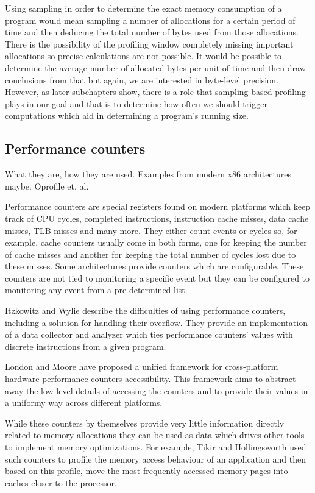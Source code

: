 Using sampling in order to determine the exact memory consumption of a program would mean sampling a number of allocations for a certain period of time and then deducing the total number of bytes used from those allocations. There is the possibility of the profiling window completely missing important allocations so precise calculations are not possible. It would be possible to determine the average number of allocated bytes per unit of time and then draw conclusions from that but again, we are interested in byte-level precision. However, as later subchapters show, there is a role that sampling based profiling plays in our goal and that is to determine how often we should trigger computations which aid in determining a program's running size.

\subsection{Performance counters}
\label{subsection:performancecounters}

What they are, how they are used. Examples from modern x86 architectures maybe. Oprofile et. al.

Performance counters are special registers found on modern platforms which keep track of CPU cycles, completed instructions, instruction cache misses, data cache misses, TLB misses and many more. They either count events or cycles so, for example, cache counters usually come in both forms, one for keeping the number of cache misses and another for keeping the total number of cycles lost due to these misses. Some architectures provide counters which are configurable. These counters are not tied to monitoring a specific event but they can be configured to monitoring any event from a pre-determined list.

Itzkowitz and Wylie\cite{Itzkowitz03} describe the difficulties of using performance counters, including a solution for handling their overflow. They provide an implementation of a data collector and analyzer which ties performance counters' values with discrete instructions from a given program.

London and Moore have proposed a unified framework for cross-platform hardware performance counters accessibility\cite{London01}. This framework aims to abstract away the low-level details of accessing the counters and to provide their values in a uniformy way across different platforms.

While these counters by themselves provide very little information directly related to memory allocations they can be used as data which drives other tools to implement memory optimizations. For example, Tikir and Hollingsworth\cite{Tikir04} used such counters to profile the memory access behaviour of an application and then based on this profile, move the most frequently accessed memory pages into caches closer to the processor.

